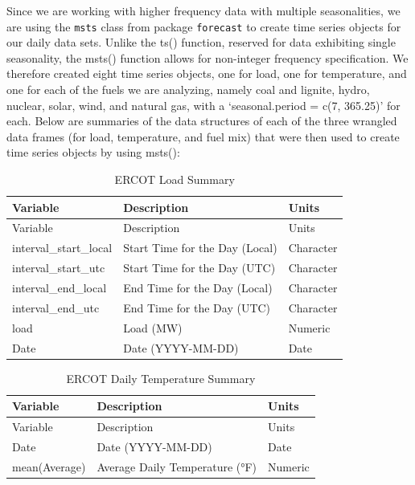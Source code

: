 \documentclass[
]{article}
\begin{document}
Since we are working with higher frequency data with multiple
seasonalities, we are using the \texttt{msts} class from package
\texttt{forecast} to create time series objects for our daily data sets.
Unlike the ts() function, reserved for data exhibiting single
seasonality, the msts() function allows for non-integer frequency
specification. We therefore created eight time series objects, one for
load, one for temperature, and one for each of the fuels we are
analyzing, namely coal and lignite, hydro, nuclear, solar, wind, and
natural gas, with a `seasonal.period = c(7, 365.25)' for each. Below are
summaries of the data structures of each of the three wrangled data
frames (for load, temperature, and fuel mix) that were then used to
create time series objects by using msts():

\begin{longtable}[]{@{}lll@{}}
\caption{ERCOT Load Summary}\tabularnewline
\toprule\noalign{}
Variable & Description & Units \\
\midrule\noalign{}
\endfirsthead
\toprule\noalign{}
Variable & Description & Units \\
\midrule\noalign{}
\endhead
\bottomrule\noalign{}
\endlastfoot
interval\_start\_local & Start Time for the Day (Local) & Character \\
interval\_start\_utc & Start Time for the Day (UTC) & Character \\
interval\_end\_local & End Time for the Day (Local) & Character \\
interval\_end\_utc & End Time for the Day (UTC) & Character \\
load & Load (MW) & Numeric \\
Date & Date (YYYY-MM-DD) & Date \\
\end{longtable}

\begin{longtable}[]{@{}lll@{}}
\caption{ERCOT Daily Temperature Summary}\tabularnewline
\toprule\noalign{}
Variable & Description & Units \\
\midrule\noalign{}
\endfirsthead
\toprule\noalign{}
Variable & Description & Units \\
\midrule\noalign{}
\endhead
\bottomrule\noalign{}
\endlastfoot
Date & Date (YYYY-MM-DD) & Date \\
mean(Average) & Average Daily Temperature (°F) & Numeric \\
\end{longtable}
\end{document}
